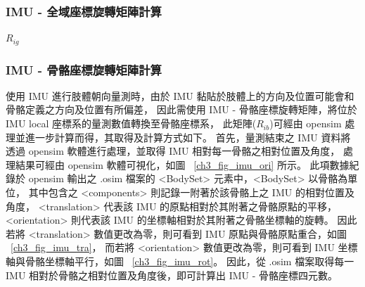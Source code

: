 \subsubsection{IMU - 全域座標旋轉矩陣計算}
$R_{ig}$

\subsubsection{IMU - 骨骼座標旋轉矩陣計算}
使用 IMU 進行肢體朝向量測時，由於 IMU 黏貼於肢體上的方向及位置可能會和骨骼定義之方向及位置有所偏差，
因此需使用 IMU - 骨骼座標旋轉矩陣，將位於 IMU local 座標系的量測數值轉換至骨骼座標系，
此矩陣($R_{ib}$)可經由 opensim 處理並進一步計算而得，其取得及計算方式如下。
首先，量測結束之 IMU 資料將透過 opensim 軟體進行處理，並取得 IMU 相對每一骨骼之相對位置及角度，
處理結果可經由 opensim 軟體可視化，如圖 ~\ref{ch3_fig_imu_ori} 所示。
此項數據紀錄於 opensim 輸出之 .osim 檔案的 <BodySet> 元素中，<BodySet> 以骨骼為單位，
其中包含之 <components> 則記錄一附著於該骨骼上之 IMU 的相對位置及角度，
<translation> 代表該 IMU 的原點相對於其附著之骨骼原點的平移，
<orientation> 則代表該 IMU 的坐標軸相對於其附著之骨骼坐標軸的旋轉。
因此若將 <translation> 數值更改為零，則可看到 IMU 原點與骨骼原點重合，如圖 ~\ref{ch3_fig_imu_tra}，
而若將 <orientation> 數值更改為零，則可看到 IMU 坐標軸與骨骼坐標軸平行，如圖 ~\ref{ch3_fig_imu_rot}。
因此，從 .osim 檔案取得每一 IMU 相對於骨骼之相對位置及角度後，即可計算出 IMU - 骨骼座標四元數。
